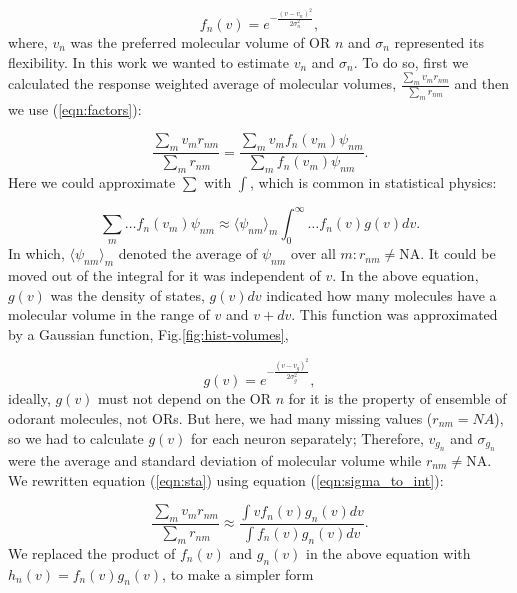 \documentclass[11pt]{paper} %
\begin{document}
\begin{equation}
	\displaystyle f_n(v) = e^{-\frac{(v-v_n)^2}{2\sigma^2_n}}, 
	\label{eqn:volume-dependence}
\end{equation}
where, $v_n$ was the preferred molecular volume of OR $n$ and $\sigma_n$ represented its flexibility. 
In this work we wanted to estimate $v_n$ and $\sigma_n$. 
To do so, first we calculated the response weighted average of molecular volumes, 
$\frac{\sum_{m} v_m r_{nm}}{\sum_{m} r_{nm}}$ and then we use (\ref{eqn:factors}):

\begin{equation}
	\frac{\displaystyle \sum_{m} v_m r_{nm}}{\displaystyle \sum_{m} r_{nm}} = \frac{\displaystyle \sum_{m} v_m f_n(v_m) \psi_{nm}}{\displaystyle \sum_{m} f_n(v_m) \psi_{nm}}.
	\label{eqn:sta}
\end{equation}
Here we could approximate $\sum$ with $\int$, which is common in statistical physics:

\begin{equation}
	\sum_{m} \dots f_n(v_m) \psi_{nm} \approx  \langle \psi_{nm} \rangle_m \int_0^\infty \dots f_n(v) g(v)  dv. 
	\label{eqn:sigma_to_int}
\end{equation}
In which, 
$\langle \psi_{nm} \rangle_m$ denoted the average of $\psi_{nm}$ over all $m: r_{nm} \neq \text{NA}$. 
It could be moved out of the integral for it was independent of $v$.
In the above equation, 
$g(v)$ was the density of states, $g(v) dv$ indicated how many molecules have a molecular volume in the range of $v$ and $v+dv$.
This function was approximated by a Gaussian function, Fig.\ref{fig:hist-volumes}, 

\begin{equation}
	g(v) = e^{-\frac{(v- v_{g})^2}{2 \sigma_{g}^2}},
	\label{eqn:hist-volumes}
\end{equation}
ideally, $g(v)$ must not depend on the OR $n$ for it is the property of ensemble of odorant molecules, not ORs. 
But here, we had many missing values ($r_{nm} = NA$), 
so we had to calculate $g(v)$ for each neuron separately; 
Therefore, $v_{g_n}$ and $\sigma_{g_n}$ were the average and standard deviation of molecular volume while $r_{nm} \neq \text{NA}$.
We rewritten equation (\ref{eqn:sta}) using equation (\ref{eqn:sigma_to_int}):

\begin{equation}
	\frac{\displaystyle \sum_{m} v_m r_{nm}}{\displaystyle \sum_{m} r_{nm}} \approx \frac{\displaystyle \int v f_n(v) g_n(v) dv}{\displaystyle \int f_n(v) g_n(v) dv}.
	\label{eqn:sta_int}
\end{equation}
We replaced the product of $f_n(v)$ and $g_n(v)$ in the above equation with $h_n(v) = f_n(v) g_n(v)$, to make a simpler form
\end{document}

